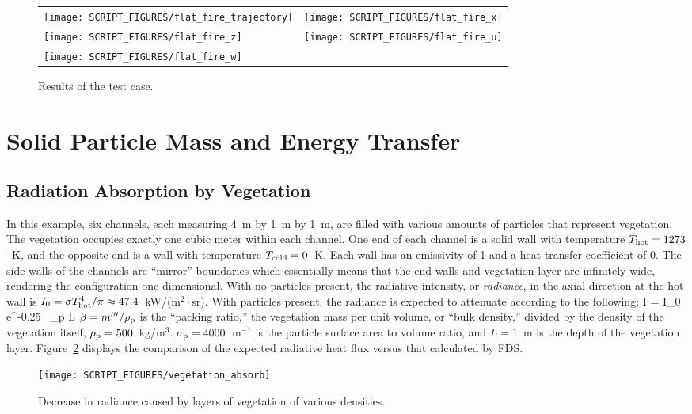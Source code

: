 \documentclass[11pt]{book}
\begin{document}
\begin{figure}[!ht]
\begin{tabular*}{\textwidth}{l@{\extracolsep{\fill}}r}
\texttt{[image: SCRIPT\_FIGURES/flat\_fire\_trajectory]} &
\texttt{[image: SCRIPT\_FIGURES/flat\_fire\_x]} \\
\texttt{[image: SCRIPT\_FIGURES/flat\_fire\_z]} &
\texttt{[image: SCRIPT\_FIGURES/flat\_fire\_u]} \\
\texttt{[image: SCRIPT\_FIGURES/flat\_fire\_w]} &
\end{tabular*}
\caption[Results of the  test case]{Results of the  test case.}
\label{flat_fire_plots}
\end{figure}



\clearpage

\section{Solid Particle Mass and Energy Transfer}

\subsection{Radiation Absorption by Vegetation}
\label{vegetation_absorb}

In this example, six channels, each measuring 4~m by 1~m by 1~m, are filled with various amounts of particles that represent vegetation. The vegetation occupies exactly one cubic meter within each channel. One end of each channel is a solid wall with temperature $T_{\rm hot}= 1273$~K, and the opposite end is a wall with temperature $T_{\rm cold}=0$~K. Each wall has an emissivity of 1 and a heat transfer coefficient of 0. The side walls of the channels are ``mirror'' boundaries which essentially means that the end walls and vegetation layer are infinitely wide, rendering the configuration one-dimensional. With no particles present, the radiative intensity, or {\em radiance}, in the axial direction at the hot wall is $I_0=\sigma T_{\rm hot}^4/\pi \approx 47.4$~kW/(m$^2 \cdot$sr). With particles present, the radiance is expected to attenuate according to the following:
\be
   I = I_0 \, \hbox{e}^{-0.25 \, \beta \sigma_{\rm p} L}
\ee
$\beta=m'''/\rho_{\rm p}$ is the ``packing ratio,'' the vegetation mass per unit volume, or ``bulk density,'' divided by the density of the vegetation itself, $\rho_{\rm p}=500$~kg/m$^3$. $\sigma_{\rm p}=4000$~m$^{-1}$ is the particle surface area to volume ratio, and $L=1$~m is the depth of the vegetation layer. Figure~\ref{vegetation_absorb_fig} displays the comparison of the expected radiative heat flux versus that calculated by FDS.
\begin{figure}[!ht]
\centering
\texttt{[image: SCRIPT\_FIGURES/vegetation\_absorb]}
\caption[Results of the  test case]{Decrease in radiance caused by layers of vegetation of various densities.}
\label{vegetation_absorb_fig}
\end{figure}
\end{document}
